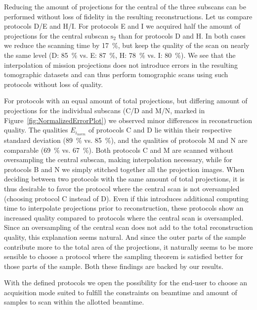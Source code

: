 Reducing the amount of projections for the central of the three subscans can be performed without loss of fidelity in the resulting reconstructions. Let us compare protocols D/E and H/I. For protocols E and I we acquired half the amount of projections for the central subscan $\textrm{s}_{2}$ than for protocols D and H. In both cases we reduce the scanning time by \SI{17}{\percent}, but keep the quality of the scan on nearly the same level (D: \SI{85}{\percent} vs. E: \SI{87}{\percent}, H: \SI{78}{\percent} vs. I: \SI{80}{\percent}).
We see that the interpolation of mission projections does not introduce errors in the resulting tomographic datasets and can thus perform tomographic scans using such protocols without loss of quality.

For protocols with an equal amount of total projections, but differing amount of projections for the individual subscans (C/D and M/N, marked in Figure~\ref{fig:NormalizedErrorPlot}) we observed minor differences in reconstruction quality. The qualities $E_{i_{norm}}$ of protocols C and D lie within their respective standard deviation (\SI{89}{\percent} vs. \SI{85}{\percent}), and the qualities of protocols M and N are comparable (\SI{69}{\percent} vs. \SI{67}{\percent}). Both protocols C and M are scanned without oversampling the central subscan, making interpolation necessary, while for protocols B and N we simply stitched together all the projection images. When deciding between two protocols with the same amount of total projections, it is thus desirable to favor the protocol where the central scan is not oversampled (\ie choosing protocol C instead of D). Even if this introduces additional computing time to interpolate projections prior to reconstruction, these protocols show an increased quality compared to protocols where the central scan is oversampled. Since an oversampling of the central scan does not add to the total reconstruction quality, this explanation seems natural. And since the outer parts of the sample contribute more to the total area of the projections, it naturally seems to be more sensible to choose a protocol where the sampling theorem is satisfied better for those parts of the sample. Both these findings are backed by our results.

With the defined protocols we open the possibility for the end-user to choose an acquisition mode suited to fulfill the constraints on beamtime and amount of samples to scan within the allotted beamtime. 

